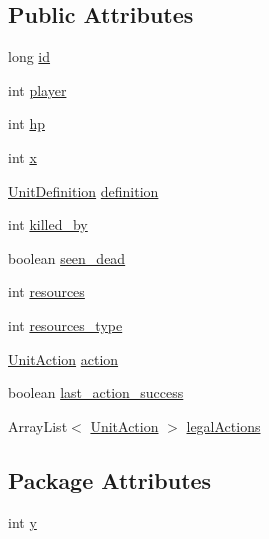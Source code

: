 \subsection*{Public Attributes}
\begin{DoxyCompactItemize}
\item 
long \hyperlink{classrts_1_1units_1_1_unit_stats_a2a17d4f66adec0d70c02ff56f57dcdc0}{id}
\item 
int \hyperlink{classrts_1_1units_1_1_unit_stats_a9f6197b668783aae1b851f6a5910802f}{player}
\item 
int \hyperlink{classrts_1_1units_1_1_unit_stats_ae6dbed9342232ad0c30a1ee809aee548}{hp}
\item 
int \hyperlink{classrts_1_1units_1_1_unit_stats_ab5601c1762edb9db5d6f4844359ec881}{x}
\item 
\hyperlink{classrts_1_1units_1_1_unit_definition}{UnitDefinition} \hyperlink{classrts_1_1units_1_1_unit_stats_a72276bc3c68668477d551b03f9237552}{definition}
\item 
int \hyperlink{classrts_1_1units_1_1_unit_stats_a7c136510fe6631fcfd9bd246698328d3}{killed\_\-by}
\item 
boolean \hyperlink{classrts_1_1units_1_1_unit_stats_aa40770ab0f85befe15759688bde51263}{seen\_\-dead}
\item 
int \hyperlink{classrts_1_1units_1_1_unit_stats_a0798670a97016a31c749dbb431e0545f}{resources}
\item 
int \hyperlink{classrts_1_1units_1_1_unit_stats_a0c1250ffeeefa0481e39ca5b77c343a1}{resources\_\-type}
\item 
\hyperlink{classrts_1_1units_1_1_unit_action}{UnitAction} \hyperlink{classrts_1_1units_1_1_unit_stats_a6720d11613b18a874df2c36e689a950d}{action}
\item 
boolean \hyperlink{classrts_1_1units_1_1_unit_stats_aab4f4e1828b46c575053ff22372ac6ed}{last\_\-action\_\-success}
\item 
ArrayList$<$ \hyperlink{classrts_1_1units_1_1_unit_action}{UnitAction} $>$ \hyperlink{classrts_1_1units_1_1_unit_stats_a5b8dcaea735d6fe1b55120355a679809}{legalActions}
\end{DoxyCompactItemize}
\subsection*{Package Attributes}
\begin{DoxyCompactItemize}
\item 
int \hyperlink{classrts_1_1units_1_1_unit_stats_a6942c21b6de9bbe54c2fd40d46934ee4}{y}
\end{DoxyCompactItemize}
